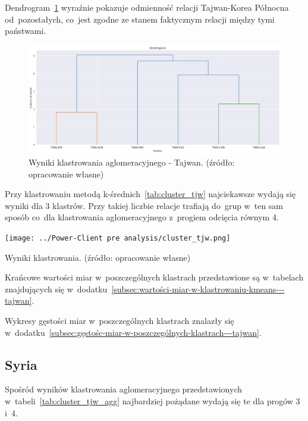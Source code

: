 \documentclass[11pt]{report}
\begin{document}
    Dendrogram~\ref{fig:cluster_tjw_agg_dendrogram} wyraźnie pokazuje odmienność relacji Tajwan-Korea Północna od~pozostałych,
    co~jest zgodne ze stanem faktycznym relacji między tymi państwami.

    \begin{figure}[tp]
        \centering
        \includegraphics[width=\linewidth]{../Power-Client pre analysis/cluster_tjw_agg_dendrogram.png}
        \caption{Wyniki klastrowania aglomeracyjnego - Tajwan. (źródło: opracowanie własne)}
        \label{fig:cluster_tjw_agg_dendrogram}
    \end{figure}


    Przy klastrowaniu metodą k-średnich~\ref{tab:cluster_tjw} najciekawsze wydają się wyniki dla 3 klastrów.
    Przy takiej liczbie relacje trafiają do~grup w~ten sam sposób co~dla klastrowania aglomeracyjnego z~progiem odcięcia równym 4.

    \begin{table}[tp]
        \centering
        \texttt{[image: ../Power-Client pre analysis/cluster\_tjw.png]}
        \caption{Wyniki klastrowania. (źródło: opracowanie własne)}
        \label{tab:cluster_tjw}
    \end{table}

    Krańcowe wartości miar w~poszczególnych klastrach przedstawione są w~tabelach
    znajdujących się w~dodatku~\ref{subsec:wartości-miar-w-klastrowaniu-kmeans---tajwan}.

    Wykresy gęstości miar w~poszczególnych klastrach znalazły się w~dodatku~\ref{subsec:gęstośc-miar-w-poszczególnych-klastrach---tajwan}.

    \subsection{Syria}

    Spośród wyników klastrowania aglomeracyjnego przedstawionych w~tabeli~\ref{tab:cluster_tjw_agg} najbardziej pożądane wydają się
    te dla progów 3 i~4.
\end{document}
